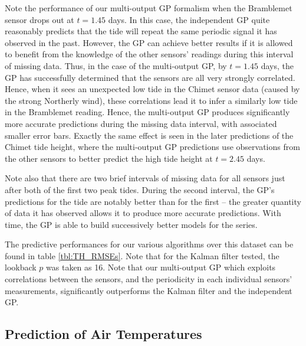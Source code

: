 \documentclass{acmtrans2m}
\begin{document}
Note the performance of our multi-output GP formalism when the Bramblemet sensor drops out at $t=1.45$ days.
In this case, the independent GP quite reasonably predicts that the tide will repeat the same periodic signal it has observed in the past. However, the GP can achieve better results if it is allowed to benefit from the knowledge of the other sensors' readings during this interval of missing data. Thus, in the case of the multi-output GP, by $t=1.45$ days, the GP has successfully determined that the sensors are all very strongly correlated. Hence, when it sees an unexpected low tide in the Chimet sensor data (caused by the strong Northerly wind), these correlations lead it to infer a similarly low tide in the Bramblemet reading. Hence, the multi-output GP produces significantly more accurate predictions during the missing data interval, with associated smaller error bars. Exactly the same effect is seen in the later predictions of the Chimet tide height, where the multi-output GP predictions use observations from the other sensors to better predict the high tide height at $t=2.45$ days. 

Note also that there are two brief intervals of missing data for all sensors just after both of the first two peak tides. During the second interval, the GP's predictions for the tide are notably better than for the first -- the greater quantity of data it has observed allows it to produce more accurate predictions. With time, the GP is able to build successively better models for the series.

The predictive performances for our various algorithms over this dataset can be found in table \ref{tbl:TH_RMSEs}. Note that for the Kalman filter tested, the lookback $p$ was taken as 16. Note that our multi-output GP which  exploits correlations between the sensors, and the periodicity in each individual sensors' measurements, significantly outperforms the Kalman filter and the independent GP.


\subsection{Prediction of Air Temperatures}
\end{document}
